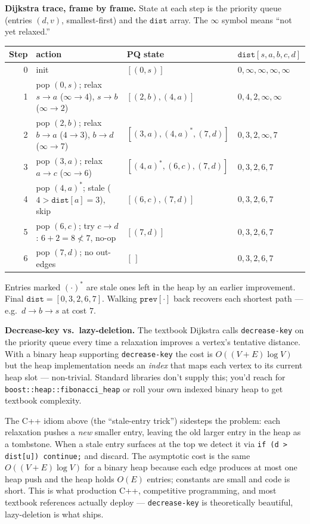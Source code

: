 \documentclass[11pt]{article}
\begin{document}
\begin{examplebox}
\textbf{Dijkstra trace, frame by frame.} State at each step is
the priority queue (entries $(d, v)$, smallest-first) and the
$\texttt{dist}$ array. The $\infty$ symbol means ``not yet
relaxed.''

\medskip
\begin{tabular}{rp{6cm}|p{4.5cm}|l}
\hline
Step & action & PQ state & $\texttt{dist}[s,a,b,c,d]$ \\
\hline
0 & init & $[(0,s)]$ & $0, \infty, \infty, \infty, \infty$ \\
1 & pop $(0,s)$; relax $s{\to}a$ ($\infty\!\to\!4$), $s{\to}b$ ($\infty\!\to\!2$) & $[(2,b),(4,a)]$ & $0, 4, 2, \infty, \infty$ \\
2 & pop $(2,b)$; relax $b{\to}a$ ($4\!\to\!3$), $b{\to}d$ ($\infty\!\to\!7$) & $[(3,a),(4,a)^{*},(7,d)]$ & $0, 3, 2, \infty, 7$ \\
3 & pop $(3,a)$; relax $a{\to}c$ ($\infty\!\to\!6$) & $[(4,a)^{*},(6,c),(7,d)]$ & $0, 3, 2, 6, 7$ \\
4 & pop $(4,a)^{*}$; stale ($4 > \texttt{dist}[a] = 3$), skip & $[(6,c),(7,d)]$ & $0, 3, 2, 6, 7$ \\
5 & pop $(6,c)$; try $c{\to}d$: $6{+}2 = 8 \not< 7$, no-op & $[(7,d)]$ & $0, 3, 2, 6, 7$ \\
6 & pop $(7,d)$; no out-edges & $[\,]$ & $0, 3, 2, 6, 7$ \\
\hline
\end{tabular}

\medskip
Entries marked $(\cdot)^{*}$ are stale ones left in the heap by an
earlier improvement. Final $\texttt{dist} = [0, 3, 2, 6, 7]$.
Walking $\texttt{prev}[\cdot]$ back recovers each shortest path
--- e.g.\ $d \to b \to s$ at cost $7$.
\end{examplebox}

\begin{notebox}
\textbf{Decrease-key vs.\ lazy-deletion.} The textbook Dijkstra
calls \texttt{decrease-key} on the priority queue every time a
relaxation improves a vertex's tentative distance. With a binary
heap supporting \texttt{decrease-key} the cost is
$O((V + E) \log V)$ but the heap implementation needs an
\emph{index} that maps each vertex to its current heap slot ---
non-trivial. Standard libraries don't supply this; you'd reach for
\texttt{boost::heap::fibonacci\_heap} or roll your own indexed
binary heap to get textbook complexity.

The C++ idiom above (the ``stale-entry trick'') sidesteps the
problem: each relaxation pushes a \emph{new} smaller entry, leaving
the old larger entry in the heap as a tombstone. When a stale entry
surfaces at the top we detect it via \texttt{if (d > dist[u])
continue;} and discard. The asymptotic cost is the same
$O((V + E) \log V)$ for a binary heap because each edge produces at
most one heap push and the heap holds $O(E)$ entries; constants are
small and code is short. This is what production C++, competitive
programming, and most textbook references actually deploy ---
\texttt{decrease-key} is theoretically beautiful, lazy-deletion is
what ships.
\end{notebox}
\end{document}
